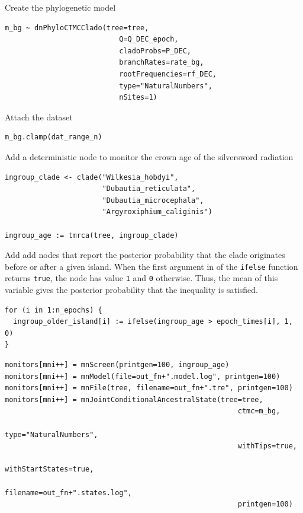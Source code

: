 Create the phylogenetic model
\begin{snugshade}
\begin{lstlisting}
m_bg ~ dnPhyloCTMCClado(tree=tree,
                           Q=Q_DEC_epoch,
                           cladoProbs=P_DEC,
                           branchRates=rate_bg,
                           rootFrequencies=rf_DEC,
                           type="NaturalNumbers",
                           nSites=1)        
\end{lstlisting}
\end{snugshade}


Attach the dataset
\begin{snugshade}
\begin{lstlisting}
m_bg.clamp(dat_range_n)
\end{lstlisting}
\end{snugshade}


Add a deterministic node to monitor the crown age of the silversword radiation

\begin{snugshade}
\begin{lstlisting}
ingroup_clade <- clade("Wilkesia_hobdyi",
                       "Dubautia_reticulata",
                       "Dubautia_microcephala",
                       "Argyroxiphium_caliginis")

ingroup_age := tmrca(tree, ingroup_clade)
\end{lstlisting}
\end{snugshade}


Add add nodes that report the posterior probability that the clade originates before or after a given island.
When the first argument in of the {\tt ifelse} function returns {\tt true}, the node has value {\tt 1} and {\tt 0} otherwise.
Thus, the mean of this variable gives the posterior probability that the inequality is satisfied.

\begin{snugshade}
\begin{lstlisting}
for (i in 1:n_epochs) {
  ingroup_older_island[i] := ifelse(ingroup_age > epoch_times[i], 1, 0)
}
\end{lstlisting}
\end{snugshade}



\begin{snugshade}
\begin{lstlisting}
monitors[mni++] = mnScreen(printgen=100, ingroup_age)
monitors[mni++] = mnModel(file=out_fn+".model.log", printgen=100)
monitors[mni++] = mnFile(tree, filename=out_fn+".tre", printgen=100)
monitors[mni++] = mnJointConditionalAncestralState(tree=tree,
                                                       ctmc=m_bg,
                                                       type="NaturalNumbers",
                                                       withTips=true,
                                                       withStartStates=true,
                                                       filename=out_fn+".states.log",
                                                       printgen=100)
\end{lstlisting}
\end{snugshade}



